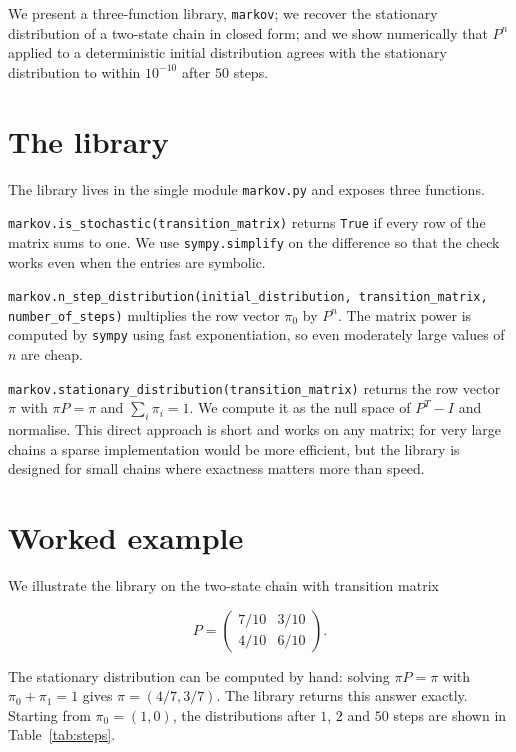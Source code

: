 \documentclass[11pt]{article}
\begin{document}
We present a three-function library,
\texttt{markov}; we recover the stationary distribution of a
two-state chain in closed form; and we show numerically that \(P^n\)
applied to a deterministic initial distribution agrees with the
stationary distribution to within \(10^{-10}\) after \(50\) steps.

\section{The library}

The library lives in the single module \texttt{markov.py} and exposes
three functions.

\texttt{markov.is\_stochastic(transition\_matrix)}
returns \texttt{True} if every row of the matrix sums to one. We use
\texttt{sympy.simplify} on the difference so that the check works even
when the entries are symbolic.

\texttt{markov.n\_step\_distribution(initial\_distribution,
transition\_matrix, number\_of\_steps)} multiplies the row vector
\(\pi_0\) by \(P^n\). The matrix power is computed by \texttt{sympy}
using fast exponentiation, so even moderately large values of \(n\)
are cheap.

\texttt{markov.stationary\_distribution(transition\_matrix)} returns
the row vector \(\pi\) with \(\pi P = \pi\) and \(\sum_i \pi_i = 1\).
We compute it as the null space of \(P^T - I\) and normalise. This
direct approach is short and works on any matrix; for very large
chains a sparse implementation would be more efficient, but the
library is designed for small chains where exactness matters more
than speed.

\section{Worked example}

We illustrate the library on the two-state chain with transition matrix

\[
    P = \begin{pmatrix} 7/10 & 3/10 \\ 4/10 & 6/10 \end{pmatrix}.
\]

The stationary distribution can be computed by hand: solving
\(\pi P = \pi\) with \(\pi_0 + \pi_1 = 1\) gives \(\pi = (4/7, 3/7)\).
The library returns this answer exactly. Starting from
\(\pi_0 = (1, 0)\), the distributions after \(1\), \(2\) and \(50\)
steps are shown in Table~\ref{tab:steps}.
\end{document}
